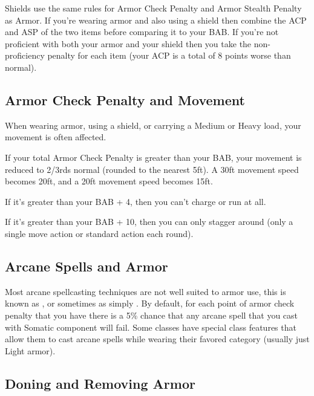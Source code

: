 Shields use the same rules for Armor Check Penalty and Armor Stealth Penalty as Armor. If you're wearing armor and also using a shield then combine the ACP and ASP of the two items before comparing it to your BAB. If you're not proficient with both your armor and your shield then you take the non-proficiency penalty for each item (your ACP is a total of 8 points worse than normal).

\subsection{Armor Check Penalty and Movement}

When wearing armor, using a shield, or carrying a Medium or Heavy load, your movement is often affected.

\begin{itemize*}
\item If your total Armor Check Penalty is greater than your BAB, your movement is reduced to 2/3rds normal (rounded to the nearest 5ft). A 30ft movement speed becomes 20ft, and a 20ft movement speed becomes 15ft.
\item If it's greater than your BAB + 4, then you can't charge or run at all.
\item If it's greater than your BAB + 10, then you can only stagger around (only a single move action or standard action each round).
\end{itemize*}

\subsection{Arcane Spells and Armor}
Most arcane spellcasting techniques are not well suited to armor use, this is known as , or sometimes as simply . By default, for each point of armor check penalty that you have there is a 5\% chance that any arcane spell that you cast with Somatic component will fail. Some classes have special class features that allow them to cast arcane spells while wearing their favored category (usually just Light armor).

\subsection{Doning and Removing Armor}

